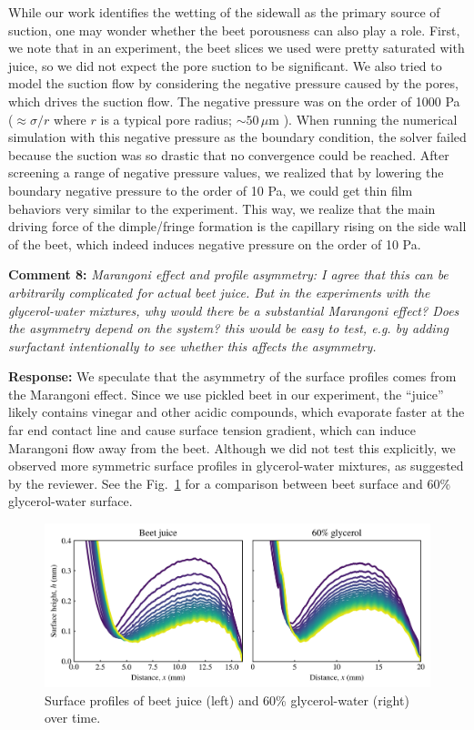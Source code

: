 \documentclass[11pt]{article}
\newif\ifhighlight
\newcommand{\hl}[1]{\ifhighlight\textcolor{blue}{#1}\else#1\fi}
\begin{document}
\hl{
While our work identifies the wetting of the sidewall as the primary source of suction, one may wonder whether the beet porousness can also play a role. 
First, we note that in an experiment, the beet slices we used were pretty saturated with juice, so we did not expect the pore suction to be significant. 
We also tried to model the suction flow by considering the negative pressure caused by the pores, which drives the suction flow. The negative pressure was on the order of 1000 Pa ($\approx \sigma /r$ where $r $ is a typical pore radius; $\sim 50 \,\mu\mathrm{m}$ \cite{beetpore}). 
When running the numerical simulation with this negative pressure as the boundary condition, the solver failed because the suction was so drastic that no convergence could be reached. 
After screening a range of negative pressure values, we realized that by lowering the boundary negative pressure to the order of 10 Pa, we could get thin film behaviors very similar to the experiment. 
This way, we realize that the main driving force of the dimple/fringe formation is the capillary rising on the side wall of the beet, which indeed induces negative pressure on the order of 10 Pa. 
}

\bigskip
\begin{siderules}
\textbf{Comment 8:} \textit{Marangoni effect and profile asymmetry: I agree that this can be arbitrarily complicated for actual beet juice. But in the experiments with the glycerol-water mixtures, why would there be a substantial Marangoni effect? Does the asymmetry depend on the system? this would be easy to test, e.g. by adding surfactant intentionally to see whether this affects the asymmetry.}
\end{siderules}

\textbf{Response:} We speculate that the asymmetry of the surface profiles comes from the Marangoni effect. Since we use pickled beet in our experiment, the ``juice'' likely contains vinegar and other acidic compounds, which evaporate faster at the far end contact line and cause surface tension gradient, which can induce Marangoni flow away from the beet. Although we did not test this explicitly, we observed more symmetric surface profiles in glycerol-water mixtures, as suggested by the reviewer. See the Fig.~\ref{fig:beet-and-gw} for a comparison between beet surface and 60\% glycerol-water surface. 

\begin{figure}
    \centering
    \includegraphics[width=0.8\linewidth]{beet_and_gw.png}
    \caption{Surface profiles of beet juice (left) and 60\% glycerol-water (right) over time. }
    \label{fig:beet-and-gw}
\end{figure}
\end{document}
